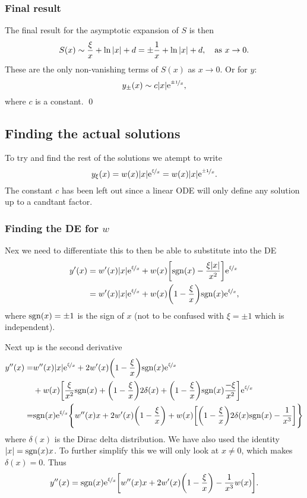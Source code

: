 \documentclass[11pt,letter, swedish, english
]{article}
\newcommand{\as}{\qcomma\text{as }}
\begin{document}
\subsubsection*{Final result}
The final result for the asymptotic expansion of $S$ is then
\begin{equation}
S(x)\sim \frac{\xi}{x}+\ln|x|+d = \pm\frac{1}{x}+\ln|x|+d\as x\to0.
\end{equation}
These are the only non-vanishing terms of $S(x)$ as $x\to0$. Or for
$y$:
\begin{equation}
y_\pm(x)\sim c\abs{x}\mathrm{e}^{\nicefrac{\pm1}{x}},
\end{equation}
where $c$ is a constant. \qed


\subsection{Finding the actual solutions}
\newcommand{\eexix}{\ensuremath{\ee^{\nicefrac{\xi}{x}}}}
\newcommand{\sgn}[1]{\ensuremath{\mathrm{sgn}\qty(#1)}}
To try and find the rest of the solutions we atempt to write
\begin{equation}
y_\xi(x)=w(x)\abs{x}\eexix =w(x)\abs{x}\ee^{\nicefrac{\pm1}{x}}. 
\end{equation}
The constant $c$ has been left out since a linear ODE will only define
any solution up to a candtant factor.

\subsubsection{Finding the DE for $w$}
Nex we need to differentiate this to then be able to substitute into
the DE
\begin{equation}
\begin{aligned}
y'(x)&=w'(x)\abs{x}\eexix
+w(x)\qty[\sgn{x}-\frac{\xi\abs{x}}{x^2}]\eexix\\
&= w'(x)\abs{x}\eexix
+w(x)\qty(1-\frac{\xi}{x})\sgn{x}\eexix,
\end{aligned}
\end{equation}
where $\sgn{x}=\pm1$ is the sign of $x$ (not to be confused with
$\xi=\pm1$ which is independent).

Next up is the second derivative
\begin{equation}
\begin{aligned}
y''(x)=&w''(x)\abs{x}\eexix
+2w'(x)\qty(1-\frac{\xi}{x})\sgn{x}\eexix
\\
&+w(x)\qty[
\frac{\xi}{x^2}\sgn{x}+\qty(1-\frac{\xi}{x})2\delta(x)
+\qty(1-\frac{\xi}{x})\sgn{x}\frac{-\xi}{x^2}
]\eexix\\
=&\sgn{x}\eexix\Bigg\{w''(x)x
+2w'(x)\qty(1-\frac{\xi}{x})
+w(x)\qty[
\qty(1-\frac{\xi}{x})2\delta(x)\sgn{x}
-\frac{1}{x^3}
]\Bigg\}
\end{aligned}
\end{equation}
where $\delta(x)$ is the Dirac delta distribution. We have also used
the identity $|x|=\sgn{x}x$. To further simplify this we will only
look at $x\neq0$, which makes $\delta(x)=0$. Thus 
\begin{equation}
y''(x)=\sgn{x}\eexix\qty[
w''(x)x +2w'(x)\qty(1-\frac{\xi}{x})
-\frac{1}{x^3}w(x) ].
\end{equation}
\end{document}

